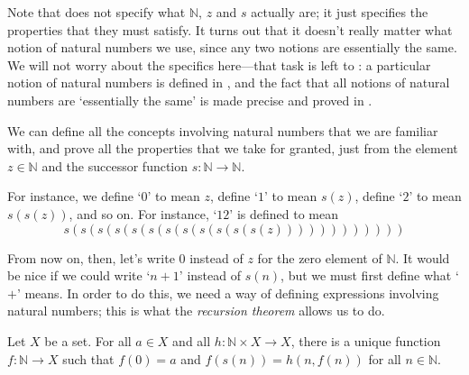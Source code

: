 Note that  does not specify what $\mathbb{N}$, $z$ and $s$ actually are; it just specifies the properties that they must satisfy. It turns out that it doesn't really matter what notion of natural numbers we use, since any two notions are essentially the same. We will not worry about the specifics here---that task is left to : a particular notion of natural numbers is defined in , and the fact that all notions of natural numbers are `essentially the same' is made precise and proved in .

We can define all the concepts involving natural numbers that we are familiar with, and prove all the properties that we take for granted, just from the element $z \in \mathbb{N}$ and the successor function $s : \mathbb{N} \to \mathbb{N}$.

For instance, we define `$0$' to mean $z$, define `$1$' to mean $s(z)$, define `$2$' to mean $s(s(z))$, and so on. For instance, `$12$' is defined to mean
\[ s(s(s(s(s(s(s(s(s(s(s(s(z)))))))))))) \]

From now on, then, let's write $0$ instead of $z$ for the zero element of $\mathbb{N}$. It would be nice if we could write `$n+1$' instead of $s(n)$, but we must first define what `$+$' means. In order to do this, we need a way of defining expressions involving natural numbers; this is what the \textit{recursion theorem} allows us to do.

\begin{theorem}
\label{thmRecursion}
Let $X$ be a set. For all $a \in X$ and all $h : \mathbb{N} \times X \to X$, there is a unique function $f : \mathbb{N} \to X$ such that $f(0) = a$ and $f(s(n)) = h(n, f(n))$ for all $n \in \mathbb{N}$.
\end{theorem}

